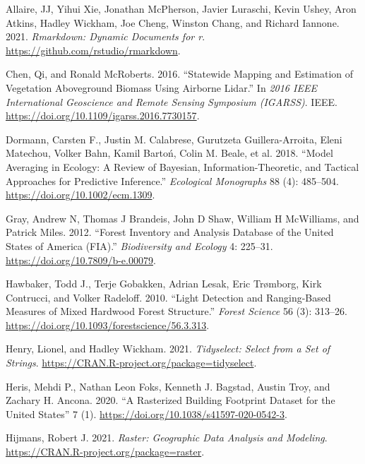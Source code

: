 \documentclass[review]{elsarticle} %
\newlength{\cslhangindent}
\newenvironment{CSLReferences}[2] %
 {%
  \setlength{\parindent}{0pt}
  \ifodd #1 \everypar{\setlength{\hangindent}{\cslhangindent}}\ignorespaces\fi
  \ifnum #2 > 0
  \setlength{\parskip}{#2\baselineskip}
  \fi
 }%
 {}
\begin{document}
\hypertarget{refs}{}
\begin{CSLReferences}{1}{0}
\leavevmode{}%
Allaire, JJ, Yihui Xie, Jonathan McPherson, Javier Luraschi, Kevin Ushey, Aron Atkins, Hadley Wickham, Joe Cheng, Winston Chang, and Richard Iannone. 2021. \emph{Rmarkdown: Dynamic Documents for r}. \url{https://github.com/rstudio/rmarkdown}.

\leavevmode{}%
Chen, Qi, and Ronald McRoberts. 2016. {``Statewide Mapping and Estimation of Vegetation Aboveground Biomass Using Airborne Lidar.''} In \emph{2016 {IEEE} International Geoscience and Remote Sensing Symposium ({IGARSS})}. {IEEE}. \url{https://doi.org/10.1109/igarss.2016.7730157}.

\leavevmode{}%
Dormann, Carsten F., Justin M. Calabrese, Gurutzeta Guillera-Arroita, Eleni Matechou, Volker Bahn, Kamil Bartoń, Colin M. Beale, et al. 2018. {``Model Averaging in Ecology: A Review of Bayesian, Information-Theoretic, and Tactical Approaches for Predictive Inference.''} \emph{Ecological Monographs} 88 (4): 485--504. \url{https://doi.org/10.1002/ecm.1309}.

\leavevmode{}%
Gray, Andrew N, Thomas J Brandeis, John D Shaw, William H McWilliams, and Patrick Miles. 2012. {``Forest Inventory and Analysis Database of the United States of America (FIA).''} \emph{Biodiversity and Ecology} 4: 225--31. \url{https://doi.org/10.7809/b-e.00079}.

\leavevmode{}%
Hawbaker, Todd J., Terje Gobakken, Adrian Lesak, Eric Trømborg, Kirk Contrucci, and Volker Radeloff. 2010. {``{Light Detection and Ranging-Based Measures of Mixed Hardwood Forest Structure}.''} \emph{Forest Science} 56 (3): 313--26. \url{https://doi.org/10.1093/forestscience/56.3.313}.

\leavevmode{}%
Henry, Lionel, and Hadley Wickham. 2021. \emph{Tidyselect: Select from a Set of Strings}. \url{https://CRAN.R-project.org/package=tidyselect}.

\leavevmode{}%
Heris, Mehdi P., Nathan Leon Foks, Kenneth J. Bagstad, Austin Troy, and Zachary H. Ancona. 2020. {``A Rasterized Building Footprint Dataset for the United States''} 7 (1). \url{https://doi.org/10.1038/s41597-020-0542-3}.

\leavevmode{}%
Hijmans, Robert J. 2021. \emph{Raster: Geographic Data Analysis and Modeling}. \url{https://CRAN.R-project.org/package=raster}.


\end{CSLReferences}
\end{document}
